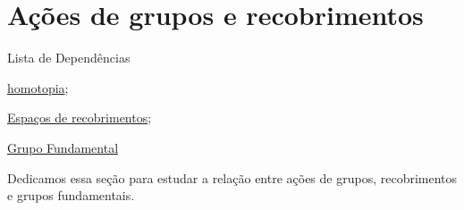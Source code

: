 \section{Ações de grupos e recobrimentos}
\label{ações-de-grupos-e-recobrimentos}

\begin{titlemize}{Lista de Dependências}
	\item \hyperref[Homotopia]{homotopia};\\ %
	\item \hyperref[espaços-de-recobrimentos]{Espaços de recobrimentos};
    \item\hyperref[Grupo-fundamental]{Grupo Fundamental}
\end{titlemize}

Dedicamos essa seção para estudar a relação entre ações de grupos, recobrimentos e grupos fundamentais. 








